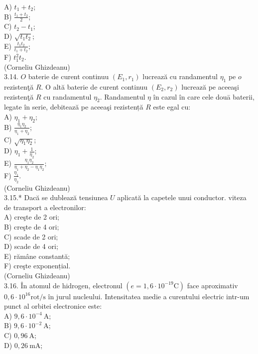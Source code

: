 \documentclass[10pt]{article}
\begin{document}
A) $t_{1}+t_{2}$;\\
B) $\frac{t_{1}+t_{2}}{2}$;\\
C) $t_{2}-t_{1}$;\\
D) $\sqrt{t_{1} t_{2}}$;\\
E) $\frac{t_{1} t_{2}}{t_{1}+t_{2}}$;\\
F) $t_{1}^{2} t_{2}$.\\
(Corneliu Ghizdeanu)\\
3.14. $O$ baterie de curent continuu $\left(E_{1}, r_{1}\right)$ lucrează cu randamentul $\eta_{1}$ pe $o$ rezistenţă $R$. O altă baterie de curent continuu $\left(E_{2}, r_{2}\right)$ lucrează pe aceeaşi rezistenţă $R$ cu randamentul $\eta_{2}$. Randamentul $\eta$ în cazul în care cele douā baterii, legate în serie, debitează pe aceeaşi rezistență $R$ este egal cu:\\
A) $\eta_{1}+\eta_{2}$;\\
B) $\frac{\eta_{1} \eta_{2}}{\eta_{1}+\eta_{2}}$;\\
C) $\sqrt{\eta_{1} \eta_{2}}$;\\
D) $\eta_{1}+\frac{1}{\eta_{2}}$;\\
E) $\frac{\eta_{1} \eta_{2}}{\eta_{1}+\eta_{2}-\eta_{1} \eta_{2}}$;\\
F) $\frac{\eta_{1}}{\eta_{2}}$.\\
(Corneliu Ghizdeanu)\\
3.15.* Dacă se dublează tensiunea $U$ aplicată la capetele unui conductor. viteza de transport a electronilor:\\
A) creşte de 2 ori;\\
B) creşte de 4 ori;\\
C) scade de 2 ori;\\
D) scade de 4 ori;\\
E) rămâne constantă;\\
F) creşte exponențial.\\
(Corneliu Ghizdeanu)\\
3.16. În atomul de hidrogen, electronul $\left(e=1,6 \cdot 10^{-19} \mathrm{C}\right)$ face aproximativ $0,6 \cdot 10^{16} \mathrm{rot} / \mathrm{s}$ în jurul nucleului. Intensitatea medie a curentului electric intr-um punct al orbitei electronice este:\\
A) $9,6 \cdot 10^{-4} \mathrm{~A}$;\\
B) $9,6 \cdot 10^{-2} \mathrm{~A}$;\\
C) $0,96 \mathrm{~A}$;\\
D) $0,26 \mathrm{~mA}$;\\
\end{document}
